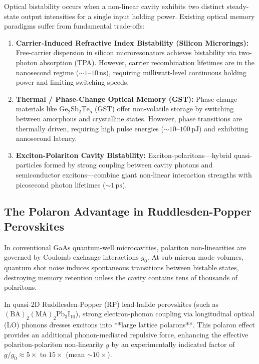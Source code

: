 \documentclass[11pt,oneside]{article}
\begin{document}
Optical bistability occurs when a non-linear cavity exhibits two distinct steady-state output intensities for a single input holding power. Existing optical memory paradigms suffer from fundamental trade-offs:

\begin{enumerate}
\item \textbf{Carrier-Induced Refractive Index Bistability (Silicon Microrings):} Free-carrier dispersion in silicon microresonators achieves bistability via two-photon absorption (TPA). However, carrier recombination lifetimes are in the nanosecond regime ($\sim 1$--$10\,\text{ns}$), requiring milliwatt-level continuous holding power and limiting switching speeds.
\item \textbf{Thermal / Phase-Change Optical Memory (GST):} Phase-change materials like $\text{Ge}_2\text{Sb}_2\text{Te}_5$ (GST) offer non-volatile storage by switching between amorphous and crystalline states. However, phase transitions are thermally driven, requiring high pulse energies ($\sim 10$--$100\,\text{pJ}$) and exhibiting nanosecond latency.
\item \textbf{Exciton-Polariton Cavity Bistability:} Exciton-polaritons---hybrid quasi-particles formed by strong coupling between cavity photons and semiconductor excitons---combine giant non-linear interaction strengths with picosecond photon lifetimes ($\sim 1\,\text{ps}$).
\end{enumerate}

\subsection{The Polaron Advantage in Ruddlesden-Popper Perovskites}

In conventional GaAs quantum-well microcavities, polariton non-linearities are governed by Coulomb exchange interactions $g_0$. At sub-micron mode volumes, quantum shot noise induces spontaneous transitions between bistable states, destroying memory retention unless the cavity contains tens of thousands of polaritons.

In quasi-2D Ruddlesden-Popper (RP) lead-halide perovskites (such as $(\text{BA})_2(\text{MA})_2\text{Pb}_3\text{I}_{10}$), strong electron-phonon coupling via longitudinal optical (LO) phonons dresses excitons into **large lattice polarons**. This polaron effect provides an additional phonon-mediated repulsive force, enhancing the effective polariton-polariton non-linearity $g$ by an experimentally indicated factor of $g / g_0 \approx 5\times\text{ to }15\times$ (mean $\sim 10\times$).
\end{document}

